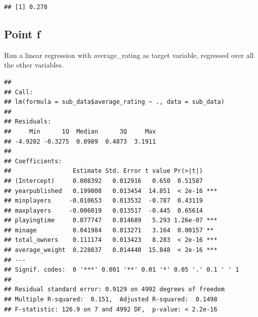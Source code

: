 \documentclass[
]{article}
\newenvironment{Shaded}{\begin{snugshade}}{\end{snugshade}}
\newcommand{\AttributeTok}[1]{\textcolor[rgb]{0.77,0.63,0.00}{#1}}
\newcommand{\ConstantTok}[1]{\textcolor[rgb]{0.00,0.00,0.00}{#1}}
\newcommand{\DecValTok}[1]{\textcolor[rgb]{0.00,0.00,0.81}{#1}}
\newcommand{\FunctionTok}[1]{\textcolor[rgb]{0.00,0.00,0.00}{#1}}
\newcommand{\NormalTok}[1]{#1}
\newcommand{\OtherTok}[1]{\textcolor[rgb]{0.56,0.35,0.01}{#1}}
\newcommand{\SpecialCharTok}[1]{\textcolor[rgb]{0.00,0.00,0.00}{#1}}
\begin{document}
\begin{verbatim}
## [1] 0.278
\end{verbatim}

\hypertarget{point-f}{%
\subsection{Point f}\label{point-f}}

Run a linear regression with average\_rating as target variable,
regressed over all the other variables.

\begin{Shaded}
\end{Shaded}

\begin{verbatim}
## 
## Call:
## lm(formula = sub_data$average_rating ~ ., data = sub_data)
## 
## Residuals:
##     Min      1Q  Median      3Q     Max 
## -4.9202 -0.3275  0.0989  0.4873  3.1911 
## 
## Coefficients:
##                 Estimate Std. Error t value Pr(>|t|)    
## (Intercept)     0.008392   0.012916   0.650  0.51587    
## yearpublished   0.199808   0.013454  14.851  < 2e-16 ***
## minplayers     -0.010653   0.013532  -0.787  0.43119    
## maxplayers     -0.006019   0.013517  -0.445  0.65614    
## playingtime     0.077747   0.014689   5.293 1.26e-07 ***
## minage          0.041984   0.013271   3.164  0.00157 ** 
## total_owners    0.111174   0.013423   8.283  < 2e-16 ***
## average_weight  0.228837   0.014440  15.848  < 2e-16 ***
## ---
## Signif. codes:  0 '***' 0.001 '**' 0.01 '*' 0.05 '.' 0.1 ' ' 1
## 
## Residual standard error: 0.9129 on 4992 degrees of freedom
## Multiple R-squared:  0.151,  Adjusted R-squared:  0.1498 
## F-statistic: 126.9 on 7 and 4992 DF,  p-value: < 2.2e-16
\end{verbatim}
\end{document}

